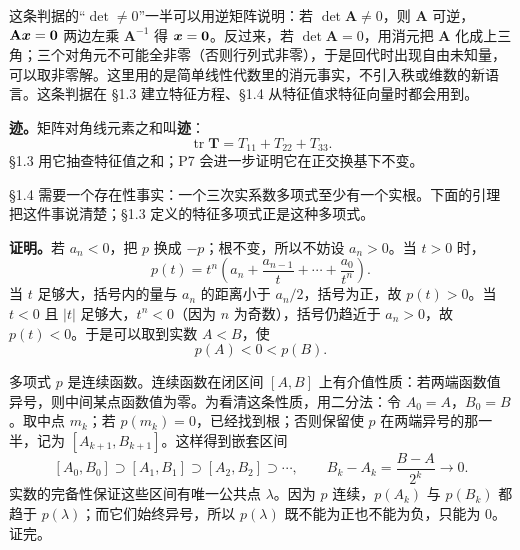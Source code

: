 \documentclass[11pt]{ctexart}
\newcommand{\ten}[1]{\mathbf{#1}}
\newcommand{\tr}{\operatorname{tr}}
\let\origsubhdr\subhdr
\renewcommand{\subhdr}[1]{\par\needspace{3\baselineskip}\origsubhdr{#1}}
\begin{document}
这条判据的“$\det\ne0$”一半可以用逆矩阵说明：若 $\det\ten A\ne0$，则 $\ten A$ 可逆，$\ten A\vect x=\vect 0$ 两边左乘 $\ten A^{-1}$ 得 $\boldsymbol{x}=\boldsymbol{0}$。反过来，若 $\det\ten A=0$，用消元把 $\ten A$ 化成上三角；三个对角元不可能全非零（否则行列式非零），于是回代时出现自由未知量，可以取非零解。这里用的是简单线性代数里的消元事实，不引入秩或维数的新语言。这条判据在 §1.3 建立特征方程、§1.4 从特征值求特征向量时都会用到。

\textbf{迹。}矩阵对角线元素之和叫\textbf{迹}：
\[
\tr\ten T=T_{11}+T_{22}+T_{33}.
\]
§1.3 用它抽查特征值之和；P7 会进一步证明它在正交换基下不变。


§1.4 需要一个存在性事实：一个三次实系数多项式至少有一个实根。下面的引理把这件事说清楚；§1.3 定义的特征多项式正是这种多项式。

\begin{center}
\end{center}

\textbf{证明。}若 $a_n<0$，把 $p$ 换成 $-p$；根不变，所以不妨设 $a_n>0$。当 $t>0$ 时，
\[
p(t)=t^n\left(a_n+\frac{a_{n-1}}{t}+\cdots+\frac{a_0}{t^n}\right).
\]
当 $t$ 足够大，括号内的量与 $a_n$ 的距离小于 $a_n/2$，括号为正，故 $p(t)>0$。当 $t<0$ 且 $|t|$ 足够大，$t^n<0$（因为 $n$ 为奇数），括号仍趋近于 $a_n>0$，故 $p(t)<0$。于是可以取到实数 $A<B$，使
\[
p(A)<0<p(B).
\]

多项式 $p$ 是连续函数。连续函数在闭区间 $[A,B]$ 上有介值性质：若两端函数值异号，则中间某点函数值为零。为看清这条性质，用二分法：令 $A_0=A$，$B_0=B$。取中点 $m_k$；若 $p(m_k)=0$，已经找到根；否则保留使 $p$ 在两端异号的那一半，记为 $[A_{k+1},B_{k+1}]$。这样得到嵌套区间
\[
[A_0,B_0]\supset[A_1,B_1]\supset[A_2,B_2]\supset\cdots,
\qquad
B_k-A_k=\frac{B-A}{2^k}\to0 .
\]
实数的完备性保证这些区间有唯一公共点 $\lambda$。因为 $p$ 连续，$p(A_k)$ 与 $p(B_k)$ 都趋于 $p(\lambda)$；而它们始终异号，所以 $p(\lambda)$ 既不能为正也不能为负，只能为 $0$。证完。

\begin{center}
\end{center}
\end{document}
